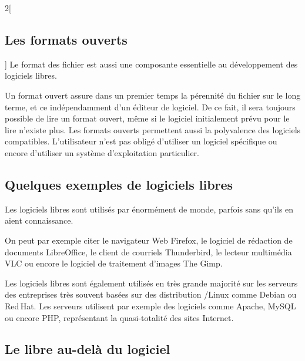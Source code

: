 \begin{multicols}{2}[\subsection{Les formats ouverts}]
Le format des fichier est aussi une composante essentielle au développement des logiciels libres.

Un \textcolor{Cdl}{format ouvert} assure dans un premier temps la pérennité du fichier sur le long terme, et ce indépendamment d’un éditeur de logiciel. De ce fait, il sera toujours possible de lire un format ouvert, même si le logiciel initialement prévu pour le lire n’existe plus. Les formats ouverts permettent aussi la polyvalence des logiciels compatibles. L’utilisateur n’est pas obligé d’utiliser un logiciel spécifique ou encore d’utiliser un système d’exploitation particulier.
\end{multicols}

\subsection{Quelques exemples de logiciels libres}


Les logiciels libres sont utilisés par énormément de monde, parfois 
sans qu’ils en aient connaissance.

On peut par exemple citer le navigateur Web \textcolor{Cdl}{Firefox}, 
le logiciel de rédaction de documents \textcolor{Cdl}{LibreOffice}, le 
client de courriels \textcolor{Cdl}{Thunderbird}, le lecteur 
multimédia \textcolor{Cdl}{VLC} ou encore le logiciel de traitement 
d’images \textcolor{Cdl}{The Gimp}.

\Separateur

Les logiciels libres sont également utilisés en très grande majorité sur 
les serveurs des entreprises très souvent basées sur des distribution 
/Linux comme \textcolor{Cdl}{Debian} ou 
\textcolor{Cdl}{Red\,Hat}. Les serveurs utilisent par exemple des 
logiciels comme \textcolor{Cdl}{Apache}, \textcolor{Cdl}{MySQL} ou 
encore \textcolor{Cdl}{PHP}, représentant la quasi-totalité des sites 
Internet.

\subsection{Le libre au-delà du logiciel}

